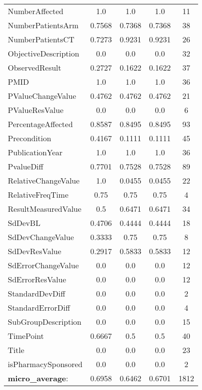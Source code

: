 \begin{longtable}{ l c c c c}
NumberAffected & 1.0 & 1.0 & 1.0 & 11\\
NumberPatientsArm & 0.7568 & 0.7368 & 0.7368 & 38\\
NumberPatientsCT & 0.7273 & 0.9231 & 0.9231 & 26\\
ObjectiveDescription & 0.0 & 0.0 & 0.0 & 32\\
ObservedResult & 0.2727 & 0.1622 & 0.1622 & 37\\
PMID & 1.0 & 1.0 & 1.0 & 36\\
PValueChangeValue & 0.4762 & 0.4762 & 0.4762 & 21\\
PValueResValue & 0.0 & 0.0 & 0.0 & 6\\
PercentageAffected & 0.8587 & 0.8495 & 0.8495 & 93\\
Precondition & 0.4167 & 0.1111 & 0.1111 & 45\\
PublicationYear & 1.0 & 1.0 & 1.0 & 36\\
PvalueDiff & 0.7701 & 0.7528 & 0.7528 & 89\\
RelativeChangeValue & 1.0 & 0.0455 & 0.0455 & 22\\
RelativeFreqTime & 0.75 & 0.75 & 0.75 & 4\\
ResultMeasuredValue & 0.5 & 0.6471 & 0.6471 & 34\\
SdDevBL & 0.4706 & 0.4444 & 0.4444 & 18\\
SdDevChangeValue & 0.3333 & 0.75 & 0.75 & 8\\
SdDevResValue & 0.2917 & 0.5833 & 0.5833 & 12\\
SdErrorChangeValue & 0.0 & 0.0 & 0.0 & 12\\
SdErrorResValue & 0.0 & 0.0 & 0.0 & 12\\
StandardDevDiff & 0.0 & 0.0 & 0.0 & 2\\
StandardErrorDiff & 0.0 & 0.0 & 0.0 & 4\\
SubGroupDescription & 0.0 & 0.0 & 0.0 & 15\\
TimePoint & 0.6667 & 0.5 & 0.5 & 40\\
Title & 0.0 & 0.0 & 0.0 & 23\\
isPharmacySponsored & 0.0 & 0.0 & 0.0 & 2\\
\textbf{micro\_average}: & 0.6958 & 0.6462 & 0.6701 & 1812 
\label{tab:Diabetes_eventextr}
\end{longtable}
